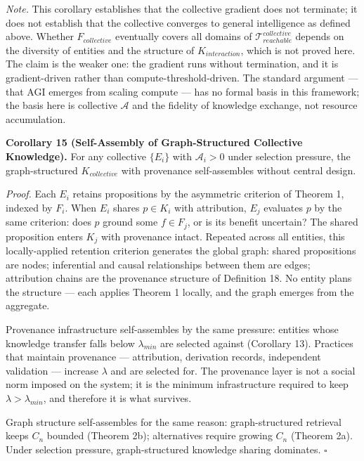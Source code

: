 \documentclass[
]{article}
\begin{document}
\emph{Note.} This corollary establishes that the collective gradient
does not terminate; it does not establish that the collective converges
to general intelligence as defined above. Whether \(F_{collective}\)
eventually covers all domains of
\(\mathcal{T}_{reachable}^{collective}\) depends on the diversity of
entities and the structure of \(K_{interaction}\), which is not proved
here. The claim is the weaker one: the gradient runs without
termination, and it is gradient-driven rather than
compute-threshold-driven. The standard argument --- that AGI emerges
from scaling compute --- has no formal basis in this framework; the
basis here is collective \(\mathcal{A}\) and the fidelity of knowledge
exchange, not resource accumulation.

\textbf{Corollary 15 (Self-Assembly of Graph-Structured Collective
Knowledge).} For any collective \(\{E_i\}\) with \(\mathcal{A}_i > 0\)
under selection pressure, the graph-structured \(K_{collective}\) with
provenance self-assembles without central design.

\emph{Proof.} Each \(E_i\) retains propositions by the asymmetric
criterion of Theorem 1, indexed by \(F_i\). When \(E_i\) shares
\(p \in K_i\) with attribution, \(E_j\) evaluates \(p\) by the same
criterion: does \(p\) ground some \(f \in F_j\), or is its benefit
uncertain? The shared proposition enters \(K_j\) with provenance intact.
Repeated across all entities, this locally-applied retention criterion
generates the global graph: shared propositions are nodes; inferential
and causal relationships between them are edges; attribution chains are
the provenance structure of Definition 18. No entity plans the structure
--- each applies Theorem 1 locally, and the graph emerges from the
aggregate.

Provenance infrastructure self-assembles by the same pressure: entities
whose knowledge transfer falls below \(\lambda_{min}\) are selected
against (Corollary 13). Practices that maintain provenance ---
attribution, derivation records, independent validation --- increase
\(\lambda\) and are selected for. The provenance layer is not a social
norm imposed on the system; it is the minimum infrastructure required to
keep \(\lambda > \lambda_{min}\), and therefore it is what survives.

Graph structure self-assembles for the same reason: graph-structured
retrieval keeps \(C_n\) bounded (Theorem 2b); alternatives require
growing \(C_n\) (Theorem 2a). Under selection pressure, graph-structured
knowledge sharing dominates. \(\square\)
\end{document}
